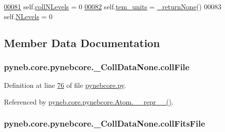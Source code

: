 \begin{DoxyCode}
\hypertarget{classpyneb_1_1core_1_1pynebcore_1_1___coll_data_none_l00081}{}\hyperlink{classpyneb_1_1core_1_1pynebcore_1_1___coll_data_none_afc8b4905545401491edcb56c8f0b556e}{00081}         self.\hyperlink{classpyneb_1_1core_1_1pynebcore_1_1___coll_data_none_aa6cfd6d6afa856ba4c102acc9180df42}{collNLevels} = 0
\hypertarget{classpyneb_1_1core_1_1pynebcore_1_1___coll_data_none_l00082}{}\hyperlink{classpyneb_1_1core_1_1pynebcore_1_1___coll_data_none_a194d717f8c873199de6a3e0cb7d7a96b}{00082}         self.\hyperlink{classpyneb_1_1core_1_1pynebcore_1_1___coll_data_none_afc8b4905545401491edcb56c8f0b556e}{tem\_units} = \hyperlink{namespacepyneb_1_1utils_1_1misc_a7adb0042ec7ea039b5a94fd243a596f1}{\_returnNone}()
00083         self.\hyperlink{classpyneb_1_1core_1_1pynebcore_1_1___coll_data_none_a194d717f8c873199de6a3e0cb7d7a96b}{NLevels} = 0

\end{DoxyCode}


\subsection{Member Data Documentation}
\hypertarget{classpyneb_1_1core_1_1pynebcore_1_1___coll_data_none_a921566608d3f514d075992b0c6870952}{
\subsubsection[{coll\-File}]{\setlength{\rightskip}{0pt plus 5cm}pyneb.\-core.\-pynebcore.\-\_\-\-Coll\-Data\-None.\-coll\-File}}\label{classpyneb_1_1core_1_1pynebcore_1_1___coll_data_none_a921566608d3f514d075992b0c6870952}


Definition at line \hyperlink{pynebcore_8py_source_l00076}{76} of file \hyperlink{pynebcore_8py_source}{pynebcore.\-py}.



Referenced by \hyperlink{pynebcore_8py_source_l02615}{pyneb.\-core.\-pynebcore.\-Atom.\-\_\-\-\_\-repr\-\_\-\-\_\-()}.

\hypertarget{classpyneb_1_1core_1_1pynebcore_1_1___coll_data_none_acb2dc662b7ca086e2d3322b79993fc60}{
\subsubsection[{coll\-Fits\-File}]{\setlength{\rightskip}{0pt plus 5cm}pyneb.\-core.\-pynebcore.\-\_\-\-Coll\-Data\-None.\-coll\-Fits\-File}}\label{classpyneb_1_1core_1_1pynebcore_1_1___coll_data_none_acb2dc662b7ca086e2d3322b79993fc60}


